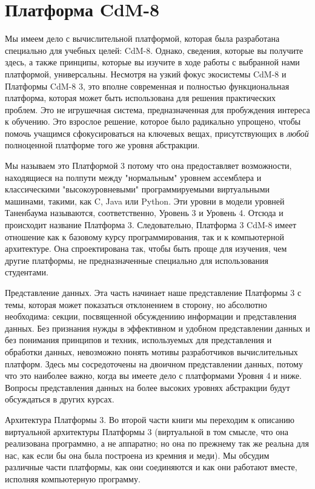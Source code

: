 \section{Платформа CdM-8}

Мы имеем дело с вычислительной платформой, которая была разработана специально для учебных целей: CdM-8.  Однако, сведения, которые вы получите здесь, а также принципы, которые вы изучите в ходе работы с выбранной нами платформой, универсальны.  Несмотря на узкий фокус экосистемы CdM-8 и Платформы CdM-8 3, это вполне современная и полностью функциональная платформа, которая может быть использована для решения практических проблем.  Это не игрушечная система, предназначенная для пробуждения интереса к обучению.  Это взрослое решение, которое было радикально упрощено, чтобы помочь учащимся сфокусироваться на ключевых вещах, присутствующих в \emph{любой} полноценной платформе того же уровня абстракции.

Мы называем это Платформой 3 потому что она предоставляет возможности, находящиеся на полпути между "нормальным" уровнем ассемблера и классическими "высокоуровневыми" программируемыми виртуальными машинами, такими, как C, Java  или Python.  Эти уровни в модели уровней Таненбаума называются, соответственно, Уровень 3 и Уровень 4.  Отсюда и происходит название Платформа 3.  Следовательно, Платформа 3 CdM-8 имеет отношение как к базовому курсу программирования, так и к компьютерной архитектуре.  Она спроектирована так, чтобы быть проще для изучения, чем другие платформы, не предназначенные специально для использования студентами.

Представление данных.  Эта часть начинает наше представление Платформы 3 с темы, которая может показаться отклонением в сторону, но абсолютно необходима: секции, посвященной обсуждениию информации и представления данных.  Без признания нужды в эффективном и удобном представлении данных и без понимания принципов и техник, используемых для представления и обработки данных, невозможно понять мотивы разработчиков вычислительных платформ.  Здесь мы сосредоточены на двоичном представлении данных, потому что это наиболее важно, когда вы имеете дело с платформами Уровня 4 и ниже.  Вопросы представления данных на более высоких уровнях абстракции будут обсуждаться в других курсах.

Архитектура Платформы 3.  Во второй части книги мы переходим к описанию виртуальной архитектуры Платформы 3 (виртуальной в том смысле, что она реализована программно, а не аппаратно; но она по прежнему так же реальна для нас, как если бы она была построена из кремния и меди).  Мы обсудим различные части платформы, как они соединяются и как они работают вместе, исполняя компьютерную программу.

